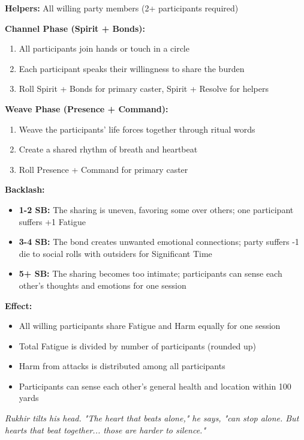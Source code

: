\documentclass[12pt,twoside]{book}
\newcommand{\shadow}[1]{\textit{#1}}
\begin{document}
\textbf{Helpers:} All willing party members (2+ participants required)

\textbf{Channel Phase (Spirit + Bonds):}
\begin{enumerate}
\item All participants join hands or touch in a circle
\item Each participant speaks their willingness to share the burden
\item Roll Spirit + Bonds for primary caster, Spirit + Resolve for helpers
\end{enumerate}

\textbf{Weave Phase (Presence + Command):}
\begin{enumerate}
\item Weave the participants' life forces together through ritual words
\item Create a shared rhythm of breath and heartbeat
\item Roll Presence + Command for primary caster
\end{enumerate}

\textbf{Backlash:}
\begin{itemize}
\item \textbf{1-2 SB:} The sharing is uneven, favoring some over others; one participant suffers +1 Fatigue
\item \textbf{3-4 SB:} The bond creates unwanted emotional connections; party suffers -1 die to social rolls with outsiders for Significant Time
\item \textbf{5+ SB:} The sharing becomes too intimate; participants can sense each other's thoughts and emotions for one session
\end{itemize}

\textbf{Effect:}
\begin{itemize}
\item All willing participants share Fatigue and Harm equally for one session
\item Total Fatigue is divided by number of participants (rounded up)
\item Harm from attacks is distributed among all participants
\item Participants can sense each other's general health and location within 100 yards
\end{itemize}

\shadow{Rukhir tilts his head. "The heart that beats alone," he says, "can stop alone. But hearts that beat together... those are harder to silence."}
\end{document}
